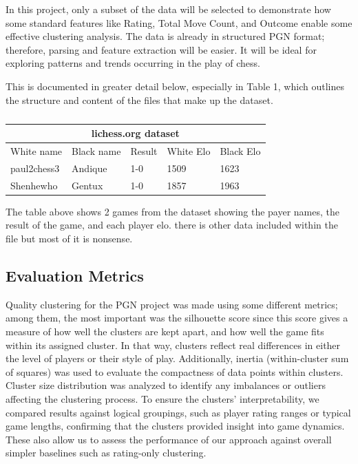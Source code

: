 \documentclass[conference]{IEEEtran}
\begin{document}
In this project, only a subset of the data will be selected to demonstrate how some standard features like Rating, Total Move Count, and Outcome enable some effective clustering analysis. The data is already in structured PGN format; therefore, parsing and feature extraction will be easier. It will be ideal for exploring patterns and trends occurring in the play of chess.

This is documented in greater detail below, especially in Table 1, which outlines the structure and content of the files that make up the dataset.

\begin{table}[htbp]
\vspace{.01cm}
\caption{}
\begin{center}
\begin{tabular}{|lllll|}
\hline
\multicolumn{5}{|c|}{lichess.org dataset}                                                                                                      \\ \hline
\multicolumn{1}{|l|}{White name}  & \multicolumn{1}{l|}{Black name} & \multicolumn{1}{l|}{Result} & \multicolumn{1}{l|}{White Elo} & Black Elo \\ \hline
\multicolumn{1}{|l|}{paul2chess3} & \multicolumn{1}{l|}{Andique}    & \multicolumn{1}{l|}{1-0}    & \multicolumn{1}{l|}{1509}      & 1623      \\ \hline
\multicolumn{1}{|l|}{Shenhewho}   & \multicolumn{1}{l|}{Gentux}     & \multicolumn{1}{l|}{1-0}    & \multicolumn{1}{l|}{1857}      & 1963      \\ \hline
\end{tabular}
\begin{minipage}{8cm}
    \vspace{0.1cm}
    \small The table above shows 2 games from the dataset showing the payer names, the result of the game, and each player elo. there is other data included within the file but most of it is nonsense.
\end{minipage}
\end{center}
\end{table}

\subsection{Evaluation Metrics}
Quality clustering for the PGN project was made using some different metrics; among them, the most important was the silhouette score since this score gives a measure of how well the clusters are kept apart, and how well the game fits within its assigned cluster. In that way, clusters reflect real differences in either the level of players or their style of play. Additionally, inertia (within-cluster sum of squares) was used to evaluate the compactness of data points within clusters. Cluster size distribution was analyzed to identify any imbalances or outliers affecting the clustering process. To ensure the clusters' interpretability, we compared results against logical groupings, such as player rating ranges or typical game lengths, confirming that the clusters provided insight into game dynamics. These also allow us to assess the performance of our approach against overall simpler baselines such as rating-only clustering.
\end{document}
